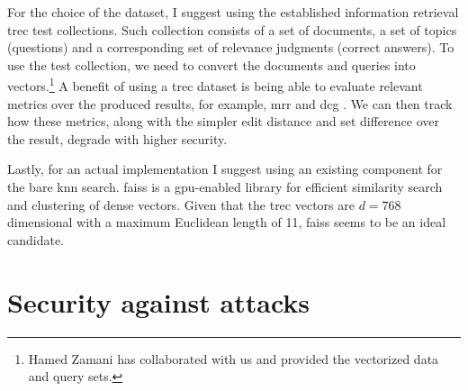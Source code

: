 		For the choice of the dataset, I suggest using the established information retrieval \acrshort{trec} test collections.
		Such collection consists of a set of documents, a set of topics (questions) and a corresponding set of relevance judgments (correct answers).
		To use the test collection, we need to convert the documents and queries into vectors.\footnote{
			Hamed Zamani has collaborated with us and provided the vectorized data and query sets.
		}
		A benefit of using a \acrshort{trec} dataset is being able to evaluate relevant metrics over the produced results, for example, \acrshort{mrr} \cite{mrr} and \acrshort{dcg} \cite{dcg}.
		We can then track how these metrics, along with the simpler edit distance and set difference over the result, degrade with higher security.

		Lastly, for an actual implementation I suggest using an existing component for the bare \acrshort{knn} search.
		\acrshort{faiss} \cite{faiss} is a \acrshort{gpu}-enabled library for efficient similarity search and clustering of dense vectors.
		Given that the \acrshort{trec} vectors are $d = 768$ dimensional with a maximum Euclidean length of 11, \acrshort{faiss} seems to be an ideal candidate.

	\section{Security against attacks}
